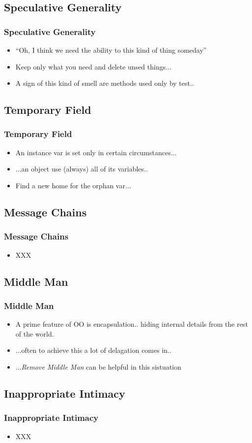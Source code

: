 \documentclass{beamer}
\begin{document}
\subsection{Speculative Generality}
\begin{frame}
  \frametitle{Speculative Generality}
  \begin{itemize}
	\item<+-> ``Oh, I think we need the ability to this kind of thing someday''
	\item<+-> Keep only what you need and delete unsed things...
	\item<+-> A sign of this  kind of smell are methods used only by test..
  \end{itemize}
\end{frame}

\subsection{Temporary Field}
\begin{frame}
  \frametitle{Temporary Field}
  \begin{itemize}
	\item<+-> An instance var is set only in certain circumstances...
	\item<+-> ...an object use (always) all of its variables.. 
	\item<+-> Find a new home for the orphan var...
  \end{itemize}
\end{frame}

\subsection{Message Chains}
\begin{frame}
  \frametitle{Message Chains}
  \begin{itemize}
	\item<+-> XXX
  \end{itemize}
\end{frame}

\subsection{Middle Man}
\begin{frame}
  \frametitle{Middle Man}
  \begin{itemize}
	\item<+-> A prime feature of OO is encapsulation.. hiding internal details from the rest of the world.
	\item<+-> ...often to achieve this a lot of delagation comes in..
	\item<+-> ...\textit{Remove Middle Man} can be helpful in this sistuation
   \end{itemize}
\end{frame}

\subsection{Inappropriate Intimacy}
\begin{frame}
  \frametitle{Inappropriate Intimacy}
  \begin{itemize}
	\item<+-> XXX 
   \end{itemize}
\end{frame}
\end{document}
